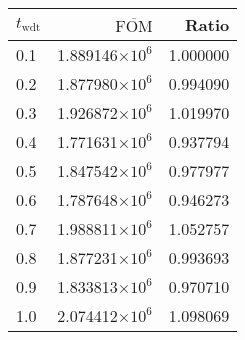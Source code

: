 \begin{tabular}{lrr}
\toprule
$t_{\mathrm{wdt}}$ & $\overline{\mathrm{FOM}}$ &    Ratio \\
\midrule
               0.1 &   1.889146$\times 10^{6}$ & 1.000000 \\
               0.2 &   1.877980$\times 10^{6}$ & 0.994090 \\
               0.3 &   1.926872$\times 10^{6}$ & 1.019970 \\
               0.4 &   1.771631$\times 10^{6}$ & 0.937794 \\
               0.5 &   1.847542$\times 10^{6}$ & 0.977977 \\
               0.6 &   1.787648$\times 10^{6}$ & 0.946273 \\
               0.7 &   1.988811$\times 10^{6}$ & 1.052757 \\
               0.8 &   1.877231$\times 10^{6}$ & 0.993693 \\
               0.9 &   1.833813$\times 10^{6}$ & 0.970710 \\
               1.0 &   2.074412$\times 10^{6}$ & 1.098069 \\
\bottomrule
\end{tabular}
